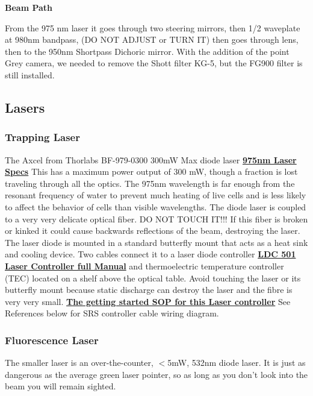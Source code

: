 \documentclass{../lab}
\begin{document}
\textbf{Beam Path}

From the 975 nm laser it goes through two steering mirrors, then 1/2 waveplate at 980nm bandpass, (DO NOT ADJUST or TURN IT) then goes through lens, then to the 950nm Shortpass Dichoric mirror. With the addition of the point Grey camera, we needed to remove the Shott filter KG-5, but the FG900 filter is still installed.

\subsection{Lasers}

\subsubsection{Trapping Laser}

The Axcel from Thorlabs BF-979-0300 300mW Max diode laser \href{http://experimentationlab.berkeley.edu/sites/default/files/images/975nm-Laser-Specs.pdf}{\textbf{975nm Laser Specs}} This has a maximum power output of 300 mW, though a fraction is lost traveling through all the optics. The 975nm wavelength is far enough from the resonant frequency of water to prevent much heating of live cells and is less likely to affect the behavior of cells than visible wavelengths. The diode laser is coupled to a very very delicate optical fiber. DO NOT TOUCH IT!!! If this fiber is broken or kinked it could cause backwards reflections of the beam, destroying the laser. The laser diode is mounted in a standard butterfly mount that acts as a heat sink and cooling device. Two cables connect it to a laser diode controller \href{http://experimentationlab.berkeley.edu/sites/default/files/images/LDC501m.pdf}{\textbf{LDC 501 Laser Controller full Manual}} and thermoelectric temperature controller (TEC) located on a shelf above the optical table. Avoid touching the laser or its butterfly mount because static discharge can destroy the laser and the fibre is very very small. \href{http://experimentationlab.berkeley.edu/sites/default/files/images/SOP\_Laser\_Diode\_Driver.pdf}{\textbf{The getting started SOP for this Laser controller}} See References below for SRS controller cable wiring diagram.

\subsubsection{Fluorescence Laser}

The smaller laser is an over-the-counter, $<$5mW, 532nm diode laser. It is just as dangerous as the average green laser pointer, so as long as you don't look into the beam you will remain sighted.
\end{document}
